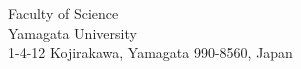 \documentclass[letter,11pt]{article}
\theoremstyle{definition}
\theoremstyle{definition}
\newcommand{\1}{\boldmath$~1~$\unboldmath}
\begin{document}
\begin{center}
{
Faculty of Science \\%
Yamagata University \\%
1-4-12 Kojirakawa, Yamagata 990-8560, Japan
}
\end{center}


\vspace{10pt}
\end{document}

